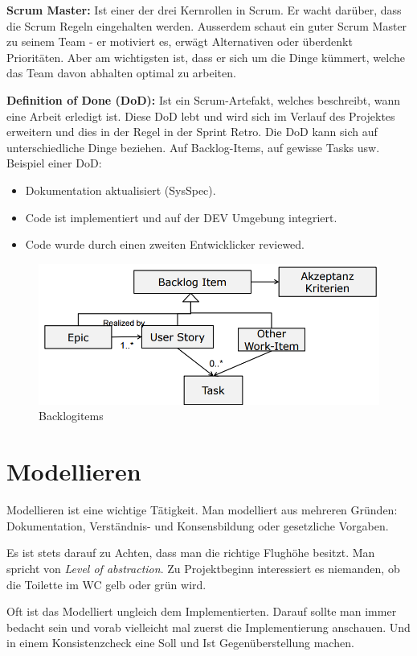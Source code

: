 \textbf{Scrum Master:} Ist einer der drei Kernrollen in Scrum. Er wacht darüber, dass die Scrum Regeln eingehalten werden. Ausserdem schaut ein guter Scrum Master zu seinem Team - er motiviert es, erwägt Alternativen oder überdenkt Prioritäten. Aber am wichtigsten ist, dass er sich um die Dinge kümmert, welche das Team davon abhalten optimal zu arbeiten.

\textbf{Definition of Done (DoD):} Ist ein Scrum-Artefakt, welches beschreibt, wann eine Arbeit erledigt ist. Diese DoD lebt und wird sich im Verlauf des Projektes erweitern und dies in der Regel in der Sprint Retro. Die DoD kann sich auf unterschiedliche Dinge beziehen. Auf Backlog-Items, auf gewisse Tasks usw. Beispiel einer DoD:

\begin{itemize}
	\item Dokumentation aktualisiert (SysSpec).
	\item Code ist implementiert und auf der DEV Umgebung integriert.
	\item Code wurde durch einen zweiten Entwicklicker reviewed.
\end{itemize}

\begin{figure}
\centering
\includegraphics[width=0.7\linewidth]{fig/backlogitems}
\caption{Backlogitems}
\label{fig:backlogitems}
\end{figure}

\section{Modellieren}
Modellieren ist eine wichtige Tätigkeit. Man modelliert aus mehreren Gründen: Dokumentation, Verständnis- und Konsensbildung oder gesetzliche Vorgaben.

Es ist stets darauf zu Achten, dass man die richtige Flughöhe besitzt. Man spricht von \emph{Level of abstraction}. Zu Projektbeginn interessiert es niemanden, ob die Toilette im WC gelb oder grün wird. 

Oft ist das Modelliert ungleich dem Implementierten. Darauf sollte man immer bedacht sein und vorab vielleicht mal zuerst die Implementierung anschauen. Und in einem Konsistenzcheck eine Soll und Ist Gegenüberstellung machen.


